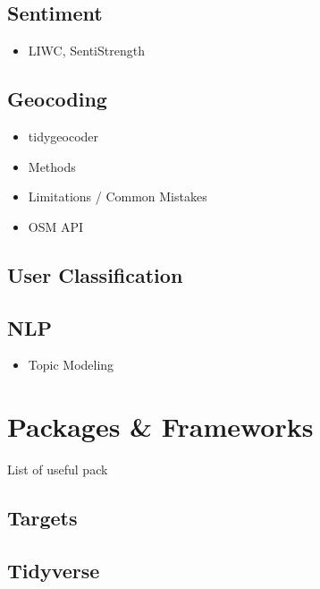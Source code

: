 \documentclass[
]{book}
\providecommand{\tightlist}{%
  \setlength{\itemsep}{0pt}\setlength{\parskip}{0pt}}
\begin{document}
\hypertarget{sentiment}{%
\section{Sentiment}\label{sentiment}}

\begin{itemize}
\tightlist
\item
  LIWC, SentiStrength
\end{itemize}

\hypertarget{geocoding}{%
\section{Geocoding}\label{geocoding}}

\begin{itemize}
\item
  tidygeocoder
\item
  Methods
\item
  Limitations / Common Mistakes
\item
  OSM API
\end{itemize}

\hypertarget{user-classification}{%
\section{User Classification}\label{user-classification}}

\hypertarget{nlp}{%
\section{NLP}\label{nlp}}

\begin{itemize}
\tightlist
\item
  Topic Modeling
\end{itemize}

\hypertarget{packages-frameworks}{%
\chapter{Packages \& Frameworks}\label{packages-frameworks}}

List of useful pack

\hypertarget{targets}{%
\section{Targets}\label{targets}}

\hypertarget{tidyverse}{%
\section{Tidyverse}\label{tidyverse}}
\end{document}
